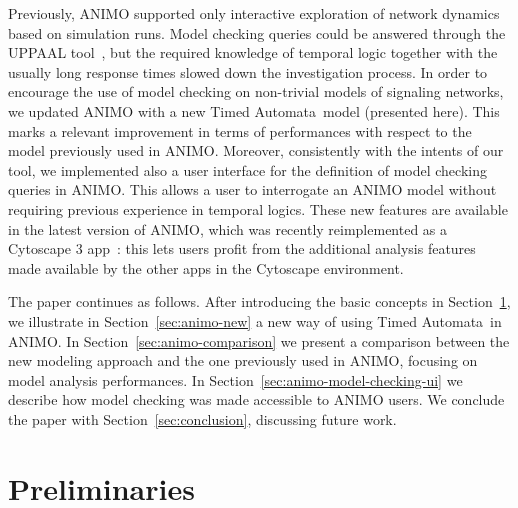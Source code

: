 \documentclass{llncs}
\newcommand{\tas}{Timed Automata}
\begin{document}
Previously, ANIMO supported only interactive exploration of network dynamics based on simulation runs. 
Model checking queries could be answered through the UPPAAL tool~\cite{uppaal}, but
the required knowledge of temporal logic together with the usually long response times slowed down the investigation process.
In order to encourage the use of model checking on non-trivial models of
signaling networks, we updated ANIMO with a new \tas\ model (presented here). This marks a relevant improvement in terms of
performances with respect to the model previously used in ANIMO. Moreover, consistently with the intents of our tool, we
implemented also a user interface for the definition of model checking queries in ANIMO. This allows a
user to interrogate an ANIMO model without requiring previous experience in temporal logics. These new
features are available in the latest version of ANIMO, which was recently reimplemented as a Cytoscape 3 app~\cite{animo-app-site}:
this lets users profit from the additional analysis features made available by the other apps in the Cytoscape environment.

The paper continues as follows.
After introducing the basic concepts in Section~\ref{sec:basics}, we illustrate in
Section~\ref{sec:animo-new} a new way of using \tas\ in ANIMO.
In Section~\ref{sec:animo-comparison} we present a comparison between the new modeling approach and the
one previously used in ANIMO,
focusing on model analysis performances. In Section~\ref{sec:animo-model-checking-ui} we describe
how model checking was made accessible to ANIMO users.
We conclude the paper with Section~\ref{sec:conclusion}, discussing future work.

\section{Preliminaries}\label{sec:basics}
\end{document}
